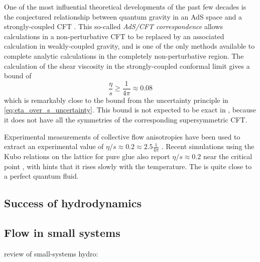 One of the most influential theoretical developments of the past few decades is the conjectured relationship between quantum gravity in an \ac{AdS} space and a strongly-coupled \ac{CFT} \cite{Maldacena:1997re}.
This so-called \emph{\ac{AdS}/\ac{CFT} correspondence} allows calculations in a non-perturbative \ac{CFT} to be replaced by an associated calculation in weakly-coupled gravity, and is one of the only methods available to complete analytic calculations in the completely non-perturbative region.
The calculation of the shear viscosity in the strongly-coupled conformal limit gives a bound of \cite{Kovtun:2004de}
\begin{equation}
  \frac{\eta}{s} \geq \frac{1}{4\pi} \approx 0.08
\end{equation}
which is remarkably close to the bound from the uncertainty principle in \cref{eq:eta_over_s_uncertainty}.
This bound is not expected to be exact in \qcd, because it does not have all the symmetries of the corresponding supersymmetric \ac{CFT}.

Experimental measurements of collective flow anisotropies have been used to extract an experimental value of $\eta/s \approx 0.2 \approx 2.5\frac{1}{4\pi}$ \cite{Heinz:2013th}.
Recent simulations using the Kubo relations on the lattice for pure glue also report $\eta/s \approx 0.2$ near the critical point \cite{Astrakhantsev:2017nrs}, with hints that it rises slowly with the temperature.
The \qgp is quite close to a perfect quantum fluid.

\subsection{Success of hydrodynamics}

\subsection{Flow in small systems}
 review of small-systems hydro: \cite{Nagle:2018nvi}



